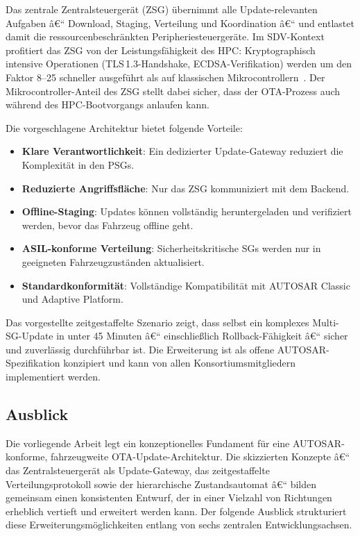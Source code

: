 ﻿\documentclass[12pt,a4paper,twoside]{article}
\begin{document}
Das zentrale Zentralsteuergerät (ZSG) übernimmt alle Update-relevanten
Aufgaben â€“ Download, Staging, Verteilung und Koordination â€“ und entlastet
damit die ressourcenbeschränkten Peripheriesteuergeräte. Im SDV-Kontext
profitiert das ZSG von der Leistungsfähigkeit des HPC: Kryptographisch
intensive Operationen (TLS\,1.3-Handshake, ECDSA-Verifikation) werden um den
Faktor 8--25 schneller ausgeführt als auf klassischen Mikrocontrollern~\cite{schneider2026ladekomm}.
Der Mikrocontroller-Anteil des ZSG stellt dabei sicher, dass der OTA-Prozess
auch während des HPC-Bootvorgangs anlaufen kann.

Die vorgeschlagene Architektur bietet folgende Vorteile:
\begin{itemize}
  \item \textbf{Klare Verantwortlichkeit}: Ein dedizierter Update-Gateway
    reduziert die Komplexität in den PSGs.
  \item \textbf{Reduzierte Angriffsfläche}: Nur das ZSG kommuniziert mit
    dem Backend.
  \item \textbf{Offline-Staging}: Updates können vollständig heruntergeladen
    und verifiziert werden, bevor das Fahrzeug offline geht.
  \item \textbf{ASIL-konforme Verteilung}: Sicherheitskritische SGs werden
    nur in geeigneten Fahrzeugzuständen aktualisiert.
  \item \textbf{Standardkonformität}: Vollständige Kompatibilität mit
    AUTOSAR Classic und Adaptive Platform.
\end{itemize}

Das vorgestellte zeitgestaffelte Szenario zeigt, dass selbst ein komplexes
Multi-SG-Update in unter 45 Minuten â€“ einschließlich Rollback-Fähigkeit â€“
sicher und zuverlässig durchführbar ist. Die Erweiterung ist als offene
AUTOSAR-Spezifikation konzipiert und kann von allen Konsortiumsmitgliedern
implementiert werden.

\subsection{Ausblick}
\label{sec:ausblick}

Die vorliegende Arbeit legt ein konzeptionelles Fundament für eine
AUTOSAR-konforme, fahrzeugweite OTA-Update-Architektur. Die skizzierten
Konzepte â€“ das Zentralsteuergerät als Update-Gateway, das zeitgestaffelte
Verteilungsprotokoll sowie der hierarchische Zustandsautomat â€“ bilden
gemeinsam einen konsistenten Entwurf, der in einer Vielzahl von Richtungen
erheblich vertieft und erweitert werden kann. Der folgende Ausblick
strukturiert diese Erweiterungsmöglichkeiten entlang von sechs zentralen
Entwicklungsachsen.
\end{document}
